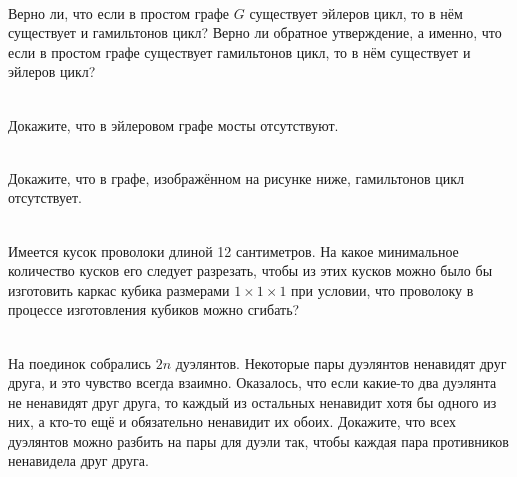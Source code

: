 \documentclass[a4paper,12pt,twoside]{article}
\begin{document}
\begin{?}[Разминочная]\ \\
     Верно ли, что если в простом графе \( G \) существует эйлеров цикл, то в нём существует и гамильтонов цикл? Верно ли обратное утверждение, а именно, что если в простом графе существует гамильтонов цикл, то в нём существует и эйлеров цикл?
\end{?}
\begin{?}\ \\
     Докажите, что в эйлеровом графе мосты отсутствуют.
\end{?}
\begin{?}\ \\
      Докажите, что в графе, изображённом на рисунке ниже, гамильтонов цикл отсутствует.    
    \begin{center}
    \end{center}
\end{?}
\begin{?}\ \\
     Имеется кусок проволоки длиной 12 сантиметров. На какое минимальное количество кусков его следует разрезать, чтобы из этих кусков можно было бы изготовить каркас кубика размерами \( 1 \times 1 \times 1 \) при условии, что проволоку в процессе изготовления кубиков можно сгибать?
\end{?}
\begin{?}\ \\
     На поединок собрались \( 2n \) дуэлянтов. Некоторые пары дуэлянтов ненавидят друг друга, и это чувство всегда взаимно. Оказалось, что если какие-то два дуэлянта не ненавидят друг друга, то каждый из остальных ненавидит хотя бы одного из них, а кто-то ещё и обязательно ненавидит их обоих. Докажите, что всех дуэлянтов можно разбить на пары для дуэли так, чтобы каждая пара противников ненавидела друг друга.
\end{?}
\end{document}
